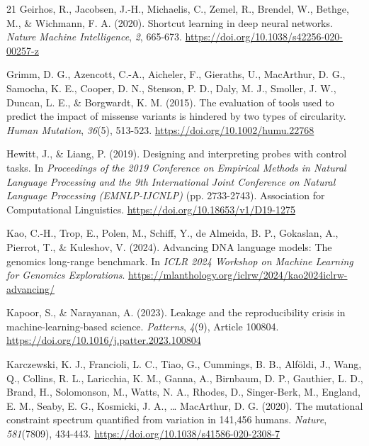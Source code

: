 \begin{thebibliography}{21}
Geirhos, R., Jacobsen, J.-H., Michaelis, C., Zemel, R., Brendel, W., Bethge, M., \& Wichmann, F. A. (2020). Shortcut learning in deep neural networks. \textit{Nature Machine Intelligence}, \textit{2}, 665-673. \url{https://doi.org/10.1038/s42256-020-00257-z}

Grimm, D. G., Azencott, C.-A., Aicheler, F., Gieraths, U., MacArthur, D. G., Samocha, K. E., Cooper, D. N., Stenson, P. D., Daly, M. J., Smoller, J. W., Duncan, L. E., \& Borgwardt, K. M. (2015). The evaluation of tools used to predict the impact of missense variants is hindered by two types of circularity. \textit{Human Mutation}, \textit{36}(5), 513-523. \url{https://doi.org/10.1002/humu.22768}

Hewitt, J., \& Liang, P. (2019). Designing and interpreting probes with control tasks. In \textit{Proceedings of the 2019 Conference on Empirical Methods in Natural Language Processing and the 9th International Joint Conference on Natural Language Processing (EMNLP-IJCNLP)} (pp. 2733-2743). Association for Computational Linguistics. \url{https://doi.org/10.18653/v1/D19-1275}

Kao, C.-H., Trop, E., Polen, M., Schiff, Y., de Almeida, B. P., Gokaslan, A., Pierrot, T., \& Kuleshov, V. (2024). Advancing DNA language models: The genomics long-range benchmark. In \textit{ICLR 2024 Workshop on Machine Learning for Genomics Explorations}. \url{https://mlanthology.org/iclrw/2024/kao2024iclrw-advancing/}

Kapoor, S., \& Narayanan, A. (2023). Leakage and the reproducibility crisis in machine-learning-based science. \textit{Patterns}, \textit{4}(9), Article 100804. \url{https://doi.org/10.1016/j.patter.2023.100804}

Karczewski, K. J., Francioli, L. C., Tiao, G., Cummings, B. B., Alf{\"o}ldi, J., Wang, Q., Collins, R. L., Laricchia, K. M., Ganna, A., Birnbaum, D. P., Gauthier, L. D., Brand, H., Solomonson, M., Watts, N. A., Rhodes, D., Singer-Berk, M., England, E. M., Seaby, E. G., Kosmicki, J. A., \ldots{} MacArthur, D. G. (2020). The mutational constraint spectrum quantified from variation in 141,456 humans. \textit{Nature}, \textit{581}(7809), 434-443. \url{https://doi.org/10.1038/s41586-020-2308-7}


\end{thebibliography}
